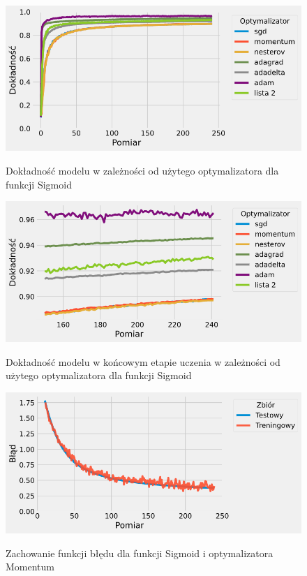 \documentclass{article}
\begin{document}
\begin{figure}[H]
	\centering
	\caption{Dokładność modelu w zależności od użytego optymalizatora dla funkcji Sigmoid}
	\includegraphics[width=\textwidth]{opt_sig_acc.png}
	\label{fig:res110}
\end{figure}
\begin{figure}[H]
	\centering
	\caption{Dokładność modelu w końcowym etapie uczenia w zależności od użytego optymalizatora dla funkcji Sigmoid}
	\includegraphics[width=\textwidth]{opt_sig_acc_zoom.png}
	\label{fig:res111}
\end{figure}
\begin{figure}[H]
	\centering
	\caption{Zachowanie funkcji błędu dla funkcji Sigmoid i optymalizatora Momentum}
	\includegraphics[width=\textwidth]{sig_mom_err.png}
	\label{fig:res112}
\end{figure}
\end{document}
